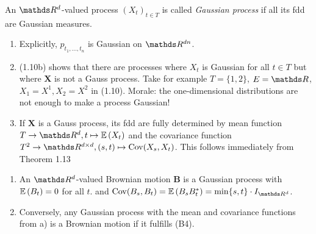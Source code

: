 \begin{defi}
An $\Rd$-valued process $(X_t)_{t \in T}$ is called \emph{Gaussian process} if all its fdd are Gaussian measures.
\end{defi}

\begin{bem}
\begin{enumerate}[label=(\alph*)]
\item Explicitly, $p_{t_1,\dots , t_n}$ is Gaussian on $\R^{dn}$.
\item (1.10b) shows that there are processes where $X_t$ is Gaussian for all $t\in T$ but where $\textbf{X}$ is not a Gauss process. Take for example $T=\{1,2\}$, $E=\R$, $X_1=X^1,X_2=X^2$ in (1.10).
Morale: the one-dimensional distributions are not enough to make a process Gaussian!
\item If $\textbf{X}$ is a Gauss process, its fdd are fully determined by mean function $T \to \Rd, t \mapsto \E{X_t}$ and the covariance function $T^2\to \R^{d\times d}, (s,t) \mapsto \Cov(X_s,X_t)$.
This follows immediately from Theorem 1.13
\end{enumerate}
\end{bem}

\begin{thm}
\begin{enumerate}[label=(\alph*)]
\item An $\Rd$-valued Brownian motion $\textbf{B}$ is a Gaussian process with $\mathbb{E}\left(B_t\right)=0$ for all $t$.
and $\Cov(B_s,B_t)=\E{B_sB_t^\ast}=\min\{s,t\} \cdot I_{\Rd}$.
\item Conversely, any Gaussian process with the mean and covariance functions from a) is a Brownian motion if it fulfills (B4).
\end{enumerate}
\end{thm}
